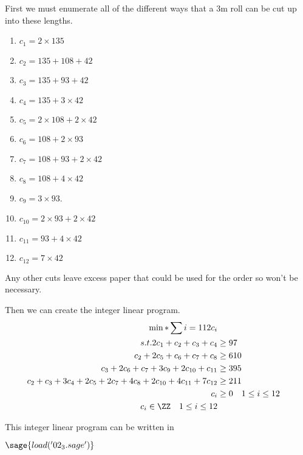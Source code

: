 \documentclass[11pt, oneside]{article}
\begin{document}
\begin{enumerate}
        First we must enumerate all of the different ways that a 3m roll can be
        cut up into these lengths.
        \begin{enumerate}
            \item $c_1 = 2 \times 135$
            \item $c_2 = 135 + 108 + 42$
            \item $c_3 = 135 + 93 + 42$
            \item $c_4 = 135 + 3 \times 42$
            \item $c_5 = 2 \times 108 + 2 \times 42$
            \item $c_6 = 108 + 2 \times 93$
            \item $c_7 = 108 + 93 + 2 \times 42$
            \item $c_8 = 108 + 4 \times 42$
            \item $c_9 = 3 \times 93$.
            \item $c_{10} = 2 \times 93 + 2 \times 42$
            \item $c_{11} = 93 + 4 \times 42$
            \item $c_{12} = 7 \times 42$
        \end{enumerate}
        Any other cuts leave excess paper that could be used for the order so
        won't be necessary.

        Then we can create the integer linear program.
        \begin{align*}
            \min* \sum{i = 1}{12}{c_i} \\
            s.t. 
            2c_1 + c_2 + c_3 + c_4 &\ge 97 \\
            c_2 + 2c_5 + c_6 + c_7 + c_8 &\ge 610 \\
            c_3 + 2 c_6 + c_7 + 3c_9 + 2c_{10} + c_{11} &\ge 395 \\
            c_2 + c_3 + 3c_4 + 2c_5 + 2c_7 + 4c_8 + 2c_{10} + 4c_{11} + 7c_{12} &\ge 211 \\
            c_i &\ge 0 \quad 1 \le i \le 12 \\
            c_i \in \ZZ \quad 1 \le i \le 12
        \end{align*}

        This integer linear program can be written in
        
        $\sage{load('02_3.sage')}$
\end{enumerate}
\end{document}
